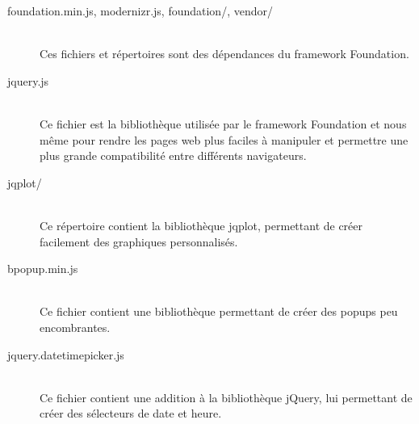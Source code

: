 \begin{description}
            \item[foundation.min.js, modernizr.js, foundation/, vendor/]\hfill \\
                Ces fichiers et répertoires sont des dépendances du framework
                Foundation.
            \item[jquery.js]\hfill \\
                Ce fichier est la bibliothèque utilisée par le framework
                Foundation et nous même pour rendre les pages web plus faciles
                à manipuler et permettre une plus grande compatibilité entre
                différents navigateurs.
            \item[jqplot/]\hfill \\
                Ce répertoire contient la bibliothèque jqplot, permettant
                de créer facilement des graphiques personnalisés.
            \item[bpopup.min.js]\hfill \\
                Ce fichier contient une bibliothèque permettant de créer des
                popups peu encombrantes.
            \item[jquery.datetimepicker.js]\hfill \\
                Ce fichier contient une addition à la bibliothèque jQuery, lui
                permettant de créer des sélecteurs de date et heure.
        \end{description}


